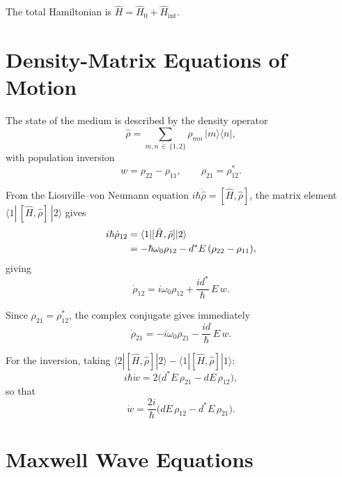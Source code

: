 \documentclass[12pt,a4paper]{article}
\begin{document}
The total Hamiltonian is $\hat{H} = \hat{H}_0 + \hat{H}_{\mathrm{int}}$.

\section{Density-Matrix Equations of Motion}

The state of the medium is described by the density operator
\begin{equation}
  \hat{\rho} = \sum_{m,n\,\in\,\{1,2\}} \rho_{mn}\,|m\rangle\langle n|,
\end{equation}
with population inversion
\begin{equation}
  w = \rho_{22} - \rho_{11}, \qquad \rho_{21} = \rho_{12}^*.
\end{equation}

From the Liouville--von Neumann equation
$i\hbar\dot{\hat{\rho}} = [\hat{H},\hat{\rho}]$,
the matrix element $\langle 1|\,[\hat{H},\hat{\rho}]\,|2\rangle$ gives
\begin{align}
  i\hbar\dot{\rho}_{12}
  &= \langle 1|[\hat{H},\hat{\rho}]|2\rangle \notag\\
  &= -\hbar\omega_0\rho_{12} - d^*E\,(\rho_{22}-\rho_{11}),
\end{align}
giving
\begin{equation}
  \dot{\rho}_{12} = i\omega_0\rho_{12} + \frac{id^*}{\hbar}\,E\,w.
  \label{eq:rho12full}
\end{equation}

Since $\rho_{21} = \rho_{12}^*$, the complex conjugate gives immediately
\begin{equation}
  \dot{\rho}_{21} = -i\omega_0\rho_{21} - \frac{id}{\hbar}\,E\,w.
  \label{eq:rho21full}
\end{equation}

For the inversion, taking
$\langle 2|[\hat{H},\hat{\rho}]|2\rangle - \langle 1|[\hat{H},\hat{\rho}]|1\rangle$:
\begin{equation}
  i\hbar\dot{w} = 2\bigl(d^*E\,\rho_{21} - dE\,\rho_{12}\bigr),
\end{equation}
so that
\begin{equation}
  \dot{w} = \frac{2i}{\hbar}\bigl(dE\,\rho_{12} - d^*E\,\rho_{21}\bigr).
  \label{eq:wfull}
\end{equation}

\section{Maxwell Wave Equations}
\end{document}
